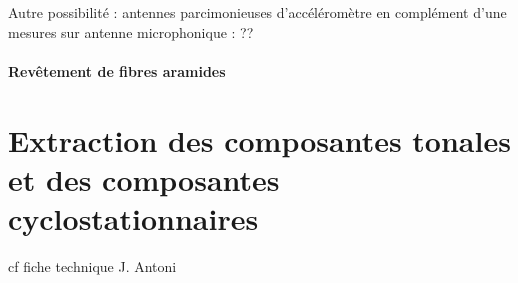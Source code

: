 Autre possibilité : antennes parcimonieuses d'accéléromètre en complément d'une mesures sur antenne microphonique : ??\\

\paragraph{\tbullet Revêtement de fibres aramides}


\section{Extraction des composantes tonales et des composantes cyclostationnaires}
cf fiche technique J. Antoni

